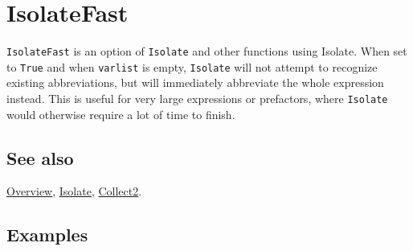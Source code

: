 \documentclass[../FeynCalcManual.tex]{subfiles}
\begin{document}
\hypertarget{isolatefast}{%
\section{IsolateFast}\label{isolatefast}}

\texttt{IsolateFast} is an option of \texttt{Isolate} and other
functions using Isolate. When set to \texttt{True} and when
\texttt{varlist} is empty, \texttt{Isolate} will not attempt to
recognize existing abbreviations, but will immediately abbreviate the
whole expression instead. This is useful for very large expressions or
prefactors, where \texttt{Isolate} would otherwise require a lot of time
to finish.

\subsection{See also}

\hyperlink{toc}{Overview}, \hyperlink{isolate}{Isolate},
\hyperlink{collect2}{Collect2}.

\subsection{Examples}
\end{document}
